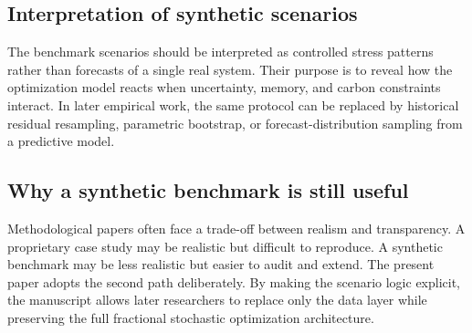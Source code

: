 \subsection{Interpretation of synthetic scenarios}
The benchmark scenarios should be interpreted as controlled stress patterns rather than forecasts of a single real system. Their purpose is to reveal how the optimization model reacts when uncertainty, memory, and carbon constraints interact. In later empirical work, the same protocol can be replaced by historical residual resampling, parametric bootstrap, or forecast-distribution sampling from a predictive model.

\subsection{Why a synthetic benchmark is still useful}
Methodological papers often face a trade-off between realism and transparency. A proprietary case study may be realistic but difficult to reproduce. A synthetic benchmark may be less realistic but easier to audit and extend. The present paper adopts the second path deliberately. By making the scenario logic explicit, the manuscript allows later researchers to replace only the data layer while preserving the full fractional stochastic optimization architecture.